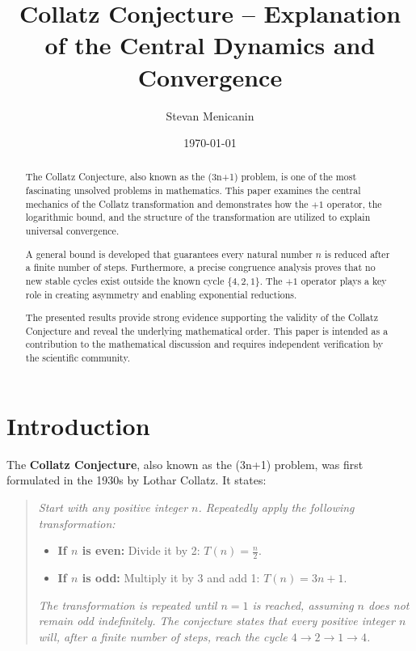 \documentclass[a4paper,12pt]{article}
\title{Collatz Conjecture – Explanation of the Central Dynamics and Convergence}
\author{Stevan Menicanin}
\date{\today}
\begin{document}
\maketitle

\renewcommand{\abstractname}{Abstract}
\begin{abstract}
    The Collatz Conjecture, also known as the (3n+1) problem, is one of the most fascinating unsolved problems in mathematics. This paper examines the central mechanics of the Collatz transformation and demonstrates how the \(+1\) operator, the logarithmic bound, and the structure of the transformation are utilized to explain universal convergence.

    A general bound is developed that guarantees every natural number \( n \) is reduced after a finite number of steps. Furthermore, a precise congruence analysis proves that no new stable cycles exist outside the known cycle \( \{4, 2, 1\} \). The \(+1\) operator plays a key role in creating asymmetry and enabling exponential reductions.

    The presented results provide strong evidence supporting the validity of the Collatz Conjecture and reveal the underlying mathematical order. This paper is intended as a contribution to the mathematical discussion and requires independent verification by the scientific community.
\end{abstract}

\newpage
\setcounter{tocdepth}{2} %

\tableofcontents

\newpage

\section{Introduction}
The \textbf{Collatz Conjecture}, also known as the (3n+1) problem, was first formulated in the 1930s by Lothar Collatz. It states:

\begin{quote}
\textit{Start with any positive integer \( n \). Repeatedly apply the following transformation:}
\begin{itemize}
    \item \textbf{If \( n \) is even:} Divide it by 2: \( T(n) = \frac{n}{2} \).
    \item \textbf{If \( n \) is odd:} Multiply it by 3 and add 1: \( T(n) = 3n + 1 \).
\end{itemize}
\textit{The transformation is repeated until \( n = 1 \) is reached, assuming \( n \) does not remain odd indefinitely. The conjecture states that every positive integer \( n \) will, after a finite number of steps, reach the cycle \( 4 \to 2 \to 1 \to 4 \).}
\end{quote}
\end{document}

